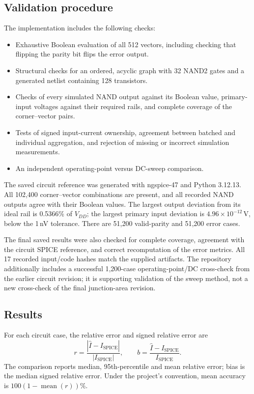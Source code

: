 \subsection{Validation procedure}
The implementation includes the following checks:
\begin{itemize}
\item Exhaustive Boolean evaluation of all 512 vectors, including checking
      that flipping the parity bit flips the error output.
\item Structural checks for an ordered, acyclic graph with 32 NAND2 gates
      and a generated netlist containing 128 transistors.
\item Checks of every simulated NAND output against its Boolean value,
      primary-input voltages against their required rails, and complete
      coverage of the corner--vector pairs.
\item Tests of signed input-current ownership, agreement between batched
      and individual aggregation, and rejection of missing or incorrect
      simulation measurements.
\item An independent operating-point versus DC-sweep comparison.
\end{itemize}
The saved circuit reference was generated with ngspice-47 and Python
3.12.13. All 102,400 corner--vector combinations are present, and all
recorded NAND outputs agree with their Boolean values. The largest output
deviation from its ideal rail is 0.5366\% of $V_{DD}$; the largest primary
input deviation is $4.96\times10^{-12}$\,V, below the 1\,nV tolerance.
There are 51,200 valid-parity and 51,200 error cases.

The final saved results were also checked for complete coverage, agreement
with the circuit SPICE reference, and correct recomputation of the error
metrics. All 17 recorded input/code hashes match the supplied artifacts.
The repository additionally includes a successful 1,200-case operating-point/DC
cross-check from the earlier circuit revision; it is supporting validation
of the sweep method, not a new cross-check of the final junction-area revision.

\subsection{Results}
For each circuit case, the relative error and signed relative error are
\begin{equation}
r=\frac{|\widehat I-I_{\mathrm{SPICE}}|}{|I_{\mathrm{SPICE}}|},
\qquad
b=\frac{\widehat I-I_{\mathrm{SPICE}}}{I_{\mathrm{SPICE}}}.
\end{equation}
The comparison reports median, 95th-percentile and mean relative error;
bias is the median signed relative error. Under the project's convention,
mean accuracy is $100(1-\operatorname{mean}(r))\%$.

